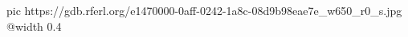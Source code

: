  
 
 
 
 

\ifcmt
  pic https://gdb.rferl.org/e1470000-0aff-0242-1a8c-08d9b98eae7e_w650_r0_s.jpg
  @width 0.4
\fi

\begin{center}
\end{center}
